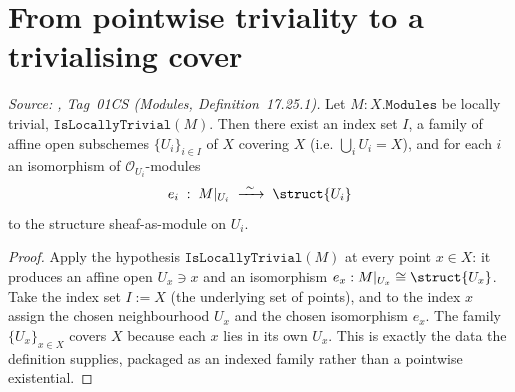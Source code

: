 \section{From pointwise triviality to a trivialising cover}
\label{sec:lbc_cover}

\begin{lemma}\leanok
  \label{lem:lbc_trivializing_cover}
  \textit{Source: \cite{stacks-project}, Tag~01CS (Modules, Definition~17.25.1).}
  Let \(M : X.\mathtt{Modules}\) be locally trivial, \(\texttt{IsLocallyTrivial}(M)\).
  Then there exist an index set \(I\), a family of affine open subschemes
  \(\{U_i\}_{i \in I}\) of \(X\) covering \(X\) (i.e. \(\bigcup_i U_i = X\)), and
  for each \(i\) an isomorphism of \(\mathcal{O}_{U_i}\)-modules
  \[
    e_i \;:\; M|_{U_i} \;\xrightarrow{\ \sim\ }\; \struct{U_i}
  \]
  to the structure sheaf-as-module on \(U_i\).
\end{lemma}

\begin{proof}
  \leanok
  Apply the hypothesis \(\texttt{IsLocallyTrivial}(M)\) at every point \(x \in X\): it
  produces an affine open \(U_x \ni x\) and an isomorphism
  \(e_x : M|_{U_x} \cong \struct{U_x}\). Take the index set \(I := X\) (the
  underlying set of points), and to the index \(x\) assign the chosen
  neighbourhood \(U_x\) and the chosen isomorphism \(e_x\). The family
  \(\{U_x\}_{x \in X}\) covers \(X\) because each \(x\) lies in its own \(U_x\).
  This is exactly the data the definition supplies, packaged as an indexed
  family rather than a pointwise existential.
\end{proof}

